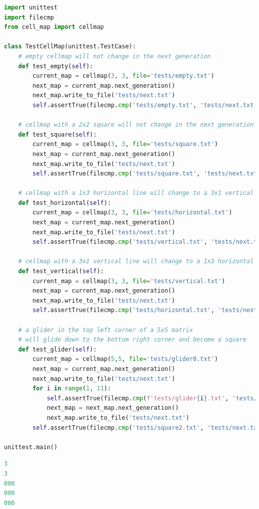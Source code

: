 \documentclass[12pt]{report}
\begin{document}
\begin{lstlisting}[language=Python, caption=cell\_map\_tests.py]
import unittest
import filecmp
from cell_map import cellmap

class TestCellMap(unittest.TestCase):
    # empty cellmap will not change in the next generation
    def test_empty(self):
        current_map = cellmap(3, 3, file='tests/empty.txt')
        next_map = current_map.next_generation()
        next_map.write_to_file('tests/next.txt')
        self.assertTrue(filecmp.cmp('tests/empty.txt', 'tests/next.txt'))
    
    # cellmap with a 2x2 square will not change in the next generation
    def test_square(self):
        current_map = cellmap(3, 3, file='tests/square.txt')
        next_map = current_map.next_generation()
        next_map.write_to_file('tests/next.txt')
        self.assertTrue(filecmp.cmp('tests/square.txt', 'tests/next.txt'))

    # cellmap with a 1x3 horizontal line will change to a 3x1 vertical line
    def test_horizontal(self):
        current_map = cellmap(3, 3, file='tests/horizontal.txt')
        next_map = current_map.next_generation()
        next_map.write_to_file('tests/next.txt')
        self.assertTrue(filecmp.cmp('tests/vertical.txt', 'tests/next.txt'))

    # cellmap with a 3x1 vertical line will change to a 1x3 horizontal line
    def test_vertical(self):
        current_map = cellmap(3, 3, file='tests/vertical.txt')
        next_map = current_map.next_generation()
        next_map.write_to_file('tests/next.txt')
        self.assertTrue(filecmp.cmp('tests/horizontal.txt', 'tests/next.txt'))

    # a glider in the top left corner of a 5x5 matrix
    # will glide down to the bottom right corner and become a square
    def test_glider(self):
        current_map = cellmap(5,5, file='tests/glider0.txt')
        next_map = current_map.next_generation()
        next_map.write_to_file('tests/next.txt')
        for i in range(1, 11):
            self.assertTrue(filecmp.cmp(f'tests/glider{i}.txt', 'tests/next.txt'))
            next_map = next_map.next_generation()
            next_map.write_to_file('tests/next.txt')
        self.assertTrue(filecmp.cmp('tests/square2.txt', 'tests/next.txt'))

unittest.main()
\end{lstlisting}

\begin{lstlisting}[language=Python, caption=empty.txt]
3
3
000
000
000
\end{lstlisting}
\end{document}

